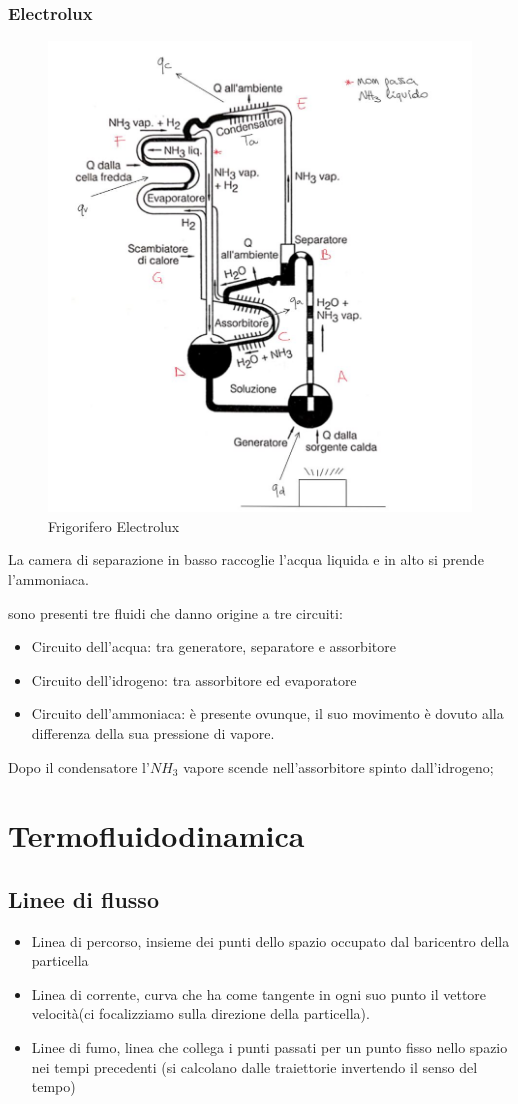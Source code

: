 \documentclass[a4paper]{article}
\numberwithin{equation}{section}%
\begin{document}
\subsubsection{Electrolux}
\begin{figure}[H]
	\begin{center}
		\includegraphics[width=0.5\columnwidth]{Electrolux.jpg}
	\end{center}
	\caption{Frigorifero Electrolux}
\end{figure}
La camera di separazione in basso raccoglie l'acqua liquida e in alto si prende l'ammoniaca.

sono presenti tre fluidi che danno origine a tre circuiti:
\begin{itemize}
	\item Circuito dell'acqua: tra generatore, separatore e assorbitore
	\item Circuito dell'idrogeno: tra assorbitore ed evaporatore
	\item Circuito dell'ammoniaca: è presente ovunque, il suo movimento è dovuto alla differenza della sua pressione di vapore.
\end{itemize}

Dopo il condensatore l'$NH_3$ vapore scende nell'assorbitore spinto dall'idrogeno; 
\newpage
\section{Termofluidodinamica}

\subsection{Linee di flusso}

\begin{itemize}
	\item Linea di percorso, insieme dei punti dello spazio occupato dal baricentro della particella
	\item Linea di corrente, curva che ha come tangente in ogni suo punto il vettore velocità(ci focalizziamo sulla direzione della particella). 
	\item Linee di fumo, linea che collega i punti passati per un punto fisso nello spazio nei tempi precedenti (si calcolano dalle traiettorie invertendo il senso del tempo)
\end{itemize}
\end{document}
